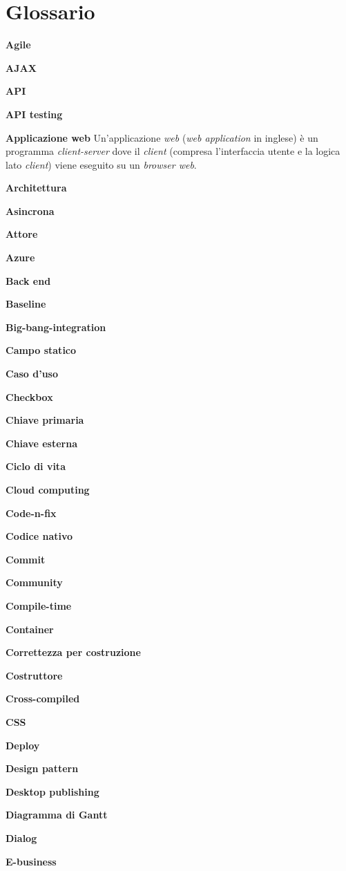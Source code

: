 \chapter{Glossario} \label{gloss}

\textbf{Agile}

\textbf{AJAX}

\textbf{API}

\textbf{API testing}

\textbf{Applicazione web} Un'applicazione \textit{web} (\textit{web application} in inglese) è un programma \textit{client-server} dove il \textit{client} (compresa l'interfaccia utente e la logica lato \textit{client}) viene eseguito su un \textit{browser web}.

\textbf{Architettura}

\textbf{Asincrona}

\textbf{Attore}

\textbf{Azure}

\textbf{Back end}

\textbf{Baseline}

\textbf{Big-bang-integration}

\textbf{Campo statico}

\textbf{Caso d'uso}

\textbf{Checkbox}

\textbf{Chiave primaria}

\textbf{Chiave esterna}

\textbf{Ciclo di vita}

\textbf{Cloud computing}

\textbf{Code-n-fix}

\textbf{Codice nativo}

\textbf{Commit}

\textbf{Community}

\textbf{Compile-time}

\textbf{Container}

\textbf{Correttezza per costruzione}

\textbf{Costruttore}

\textbf{Cross-compiled}

\textbf{CSS}

\textbf{Deploy}

\textbf{Design pattern}

\textbf{Desktop publishing}

\textbf{Diagramma di Gantt}

\textbf{Dialog}

\textbf{E-business}

